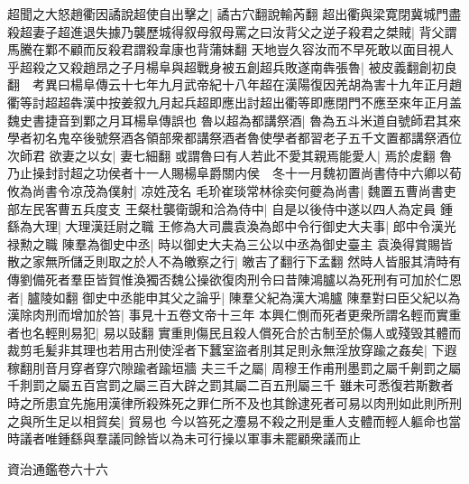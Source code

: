 超聞之大怒趙衢因譎說超使自出擊之|{
	譎古穴翻說輸芮翻}
超出衢與梁寛閉冀城門盡殺超妻子超進退失據乃襲歷城得叙母叙母罵之曰汝背父之逆子殺君之桀賊|{
	背父謂馬騰在鄴不顧而反殺君謂殺韋康也背蒲妹翻}
天地豈久容汝而不早死敢以面目視人乎超殺之又殺趙昂之子月楊阜與超戰身被五創超兵敗遂南犇張魯|{
	被皮義翻創初良翻　考異曰楊阜傳云十七年九月武帝紀十八年超在漢陽復因羌胡為害十九年正月趙衢等討超超犇漢中按姜叙九月起兵超即應出討超出衢等即應閉門不應至來年正月盖魏史書捷音到鄴之月耳楊阜傳誤也}
魯以超為都講祭酒|{
	魯為五斗米道自號師君其來學者初名鬼卒後號祭酒各領部衆都講祭酒者魯使學者都習老子五千文置都講祭酒位次師君}
欲妻之以女|{
	妻七細翻}
或謂魯曰有人若此不愛其親焉能愛人|{
	焉於䖍翻}
魯乃止操封討超之功侯者十一人賜楊阜爵關内侯　冬十一月魏初置尚書侍中六卿以荀攸為尚書令凉茂為僕射|{
	凉姓茂名}
毛玠崔琰常林徐奕何夔為尚書|{
	魏置五曹尚書吏部左民客曹五兵度支}
王粲杜襲衛覬和洽為侍中|{
	自是以後侍中遂以四人為定員}
鍾繇為大理|{
	大理漢廷尉之職}
王修為大司農袁渙為郎中令行御史大夫事|{
	郎中令漢光禄勲之職}
陳羣為御史中丞|{
	時以御史大夫為三公以中丞為御史臺主}
袁渙得賞賜皆散之家無所儲乏則取之於人不為皦察之行|{
	皦吉了翻行下孟翻}
然時人皆服其清時有傳劉備死者羣臣皆賀惟渙獨否魏公操欲復肉刑令曰昔陳鴻臚以為死刑有可加於仁恩者|{
	臚陵如翻}
御史中丞能申其父之論乎|{
	陳羣父紀為漢大鴻臚}
陳羣對曰臣父紀以為漢除肉刑而增加於笞|{
	事見十五卷文帝十三年}
本興仁惻而死者更衆所謂名輕而實重者也名輕則易犯|{
	易以䜴翻}
實重則傷民且殺人償死合於古制至於傷人或殘毁其體而裁剪毛髪非其理也若用古刑使淫者下蠶室盜者刖其足則永無淫放穿踰之姦矣|{
	下遐稼翻刖音月穿者穿穴隙踰者踰垣牆}
夫三千之屬|{
	周穆王作甫刑墨罰之屬千劓罰之屬千剕罰之屬五百宫罰之屬三百大辟之罰其屬二百五刑屬三千}
雖未可悉復若斯數者時之所患宜先施用漢律所殺殊死之罪仁所不及也其餘逮死者可易以肉刑如此則所刑之與所生足以相貿矣|{
	貿易也}
今以笞死之灋易不殺之刑是重人支體而輕人軀命也當時議者唯鍾繇與羣議同餘皆以為未可行操以軍事未罷顧衆議而止

資治通鑑卷六十六
